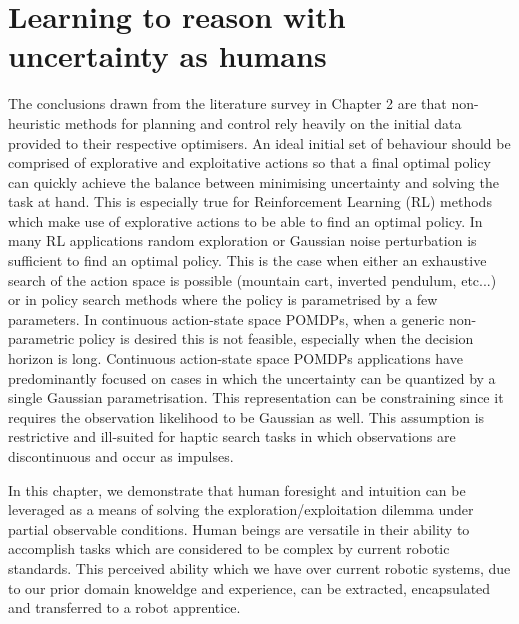 \chapter{Learning to reason with uncertainty as humans}
%
%
%
The conclusions drawn from the literature survey in Chapter 2 are that non-heuristic methods for planning and control 
rely heavily on the initial data provided to their respective optimisers. An ideal initial set of behaviour should be comprised
of explorative and exploitative actions so that a final optimal policy can quickly achieve the balance between minimising 
uncertainty and solving the task at hand. This is especially true for Reinforcement Learning (RL) methods which make use of 
explorative actions to be able to find an optimal policy. In many RL applications random exploration or Gaussian noise perturbation
is sufficient to find an optimal policy. This is the case when either an exhaustive search of the action space is possible 
(mountain cart, inverted pendulum, etc...) or in policy search methods where the policy is parametrised by a few parameters.
In continuous action-state space POMDPs, when a generic non-parametric policy is desired  this is not feasible, especially 
when the decision horizon is long. Continuous action-state space POMDPs applications have predominantly focused on cases in which 
the uncertainty can be quantized by a single Gaussian parametrisation. This representation can be constraining since it requires 
the observation likelihood to be Gaussian as well. This assumption is restrictive and ill-suited for haptic search tasks in 
which observations are discontinuous and occur as impulses. 

In this chapter, we demonstrate that human foresight and intuition can be leveraged as a means of solving the 
exploration/exploitation dilemma under partial observable conditions. Human beings are versatile in their ability to 
accomplish tasks which are considered to be complex by current robotic standards. This perceived ability which we have over 
current robotic systems, due to our prior domain knoweldge and experience, can be extracted, encapsulated and transferred 
to a robot apprentice.

